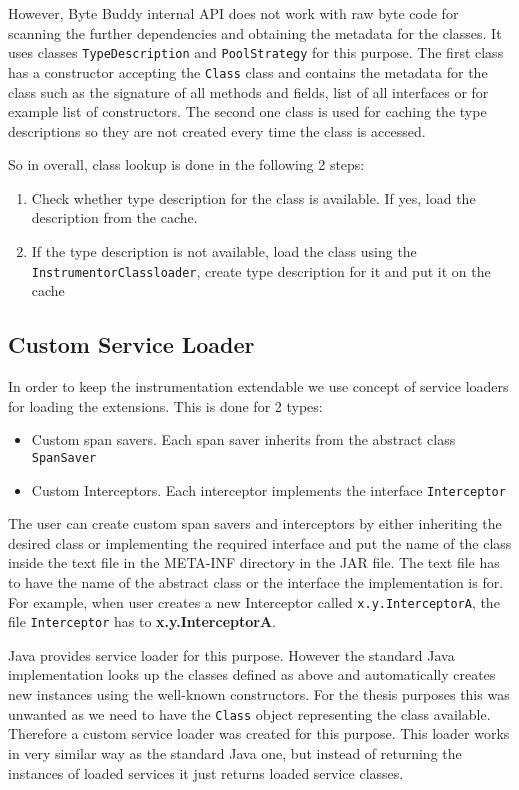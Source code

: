 However, Byte Buddy internal API does not work with raw byte code for scanning the further dependencies and obtaining the metadata for the classes. It uses classes \texttt{TypeDescription} and \texttt{PoolStrategy} for this purpose. The first class has a constructor accepting the \texttt{Class} class and contains the metadata for the class such as the signature of all methods and fields, list of all interfaces or for example list of constructors. The second one class is used for caching the type descriptions so they are not created every time the class is accessed. 

So in overall, class lookup is done in the following 2 steps:
\begin{enumerate}
	\item Check whether type description for the class is available. If yes, load the description from the cache.
	\item If the type description is not available, load the class using the \newline \texttt{InstrumentorClassloader}, create type description for it and put it on the cache
\end{enumerate}

\subsection{Custom Service Loader}
In order to keep the instrumentation extendable we use concept of service loaders for loading the extensions. This is done for 2 types:
\begin{itemize}
	\item Custom span savers. Each span saver inherits from the abstract class \texttt{SpanSaver}
	\item Custom Interceptors. Each interceptor implements the interface \texttt{Interceptor}
\end{itemize} 
The user can create custom span savers and interceptors by either inheriting the desired class or implementing the required interface and put the name of the class inside the text file in the META-INF directory in the JAR file. The text file has to have the name of the abstract class or the interface the implementation is for. For example, when user creates a new Interceptor called \texttt{x.y.InterceptorA}, the file \texttt{Interceptor} has to \textbf{x.y.InterceptorA}.

Java provides service loader for this purpose. However the standard Java implementation looks up the classes defined as above and automatically creates new instances using the well-known constructors. For the thesis purposes this was unwanted as we need to have the \texttt{Class} object representing the class available. Therefore a custom service loader was created for this purpose. This loader works in very similar way as the standard Java one, but instead of returning the instances of loaded services it just returns loaded service classes. 

